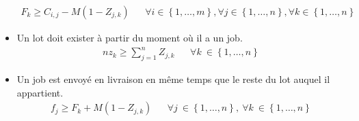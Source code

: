 \documentclass{article}
\begin{document}
\begin{itemize}
\begin{align}
                    F_k \geq C_{i,j} - M\left(1-Z_{j,k}\right) &&
                    \forall i \in\left\{1,\dotsc, m \right\},
                    \forall j \in\left\{1,\dotsc, n \right\},
                    \forall k \in\left\{1,\dotsc, n \right\}
            	\end{align}
            \item
            	Un lot doit exister à partir du moment où il a un job.
            	\begin{align}
                    n z_k\geq\sum_{j=1}^{n}Z_{j,k} &&
                    \forall k\ \in\left\{1,\dotsc,n \right\}
            	\end{align}
            \item
        	    Un job est envoyé en livraison en même temps que le reste du lot auquel il appartient.
                \begin{align}
                    f_j\geq F_k+M\left(1-Z_{j,k}\right) &&
                    \forall j\ \in\left\{1,\dotsc,n\right\},\ \forall k\ \in\left\{1,\dotsc,n\right\}
                \end{align}
        \end{itemize}


        
\end{document}
